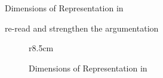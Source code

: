 \begin{omgroup}[id=syntax-semantics]{Dimensions of Representation in \omdoc}
\begin{newpart}{re-read and strengthen the argumentation}
\begin{figure}r{8.5cm}\vspace*{-1em}
\caption{Dimensions of Representation in \omdoc}\label{fig:dimensions}\vspace*{-1em}
\end{figure}

\end{newpart}
\end{omgroup}
